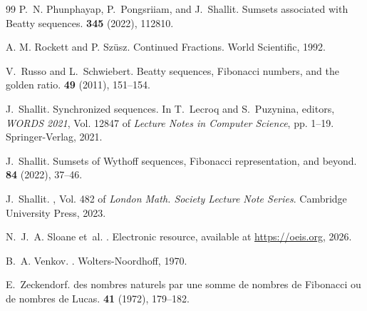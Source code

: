 \documentclass[12pt,reqno]{article}
\begin{document}
\begin{thebibliography}{99}
P.~N. Phunphayap, P.~Pongsriiam, and J.~Shallit.
\newblock Sumsets associated with {Beatty} sequences.
 {\bf 345} (2022), 112810.

A. M. Rockett and P. Sz{\"u}sz.
\newblock Continued Fractions.
\newblock World Scientific, 1992.

V.~Russo and L.~Schwiebert.
\newblock Beatty sequences, {Fibonacci} numbers, and the golden ratio.
 {\bf 49} (2011), 151--154.

J.~Shallit.
\newblock Synchronized sequences.
\newblock In T.~Lecroq and S.~Puzynina, editors, {\em WORDS 2021}, Vol. 12847
  of {\em Lecture Notes in Computer Science}, pp.  1--19. Springer-Verlag,
  2021.

J.~Shallit.
\newblock Sumsets of {Wythoff} sequences, {Fibonacci} representation, and
  beyond.
 {\bf 84} (2022), 37--46.

J.~Shallit.
, Vol. 482 of {\em London Math.
  Society Lecture Note Series}.
\newblock Cambridge University Press, 2023.

N.~J.~A. Sloane et~al.
.
\newblock Electronic resource, available at \url{https://oeis.org}, 2026.

B.~A. Venkov.
.
\newblock Wolters-Noordhoff, 1970.

E.~Zeckendorf.
 des nombres naturels par une somme de nombres de
  {Fibonacci} ou de nombres de {Lucas}.
 {\bf 41} (1972), 179--182.

\end{thebibliography}
\end{document}

